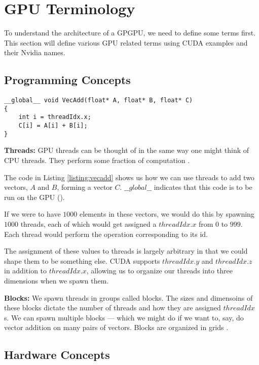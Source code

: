 \chapter{GPU Terminology}

To understand the architecture of a GPGPU, we need to define some terms first.
This section will define various GPU related terms using CUDA examples and their
Nvidia names. 

\section{Programming Concepts}

\begin{lstlisting}[caption=A simple CUDA example., label={listing:vecadd}]
__global__ void VecAdd(float* A, float* B, float* C)
{
    int i = threadIdx.x;
    C[i] = A[i] + B[i];
}

\end{lstlisting}


\textbf{Threads:} GPU threads can be thought of in the same way one might
think of CPU threads. They perform some fraction of computation \cite{nvidiaCUDAProgramming}.

The code in Listing \ref{listing:vecadd} shows us how we can use threads to add two vectors,
$A$ and $B$, forming a vector $C$. $\_\_global\_\_$ indicates that this code
is to be run on the GPU (\cite{nvidiaCUDAProgramming}).

If we were to have $1000$ elements in these vectors, we would do this 
by spawning $1000$ threads, each of which would get assigned a $threadIdx.x$
from $0$ to $999$. Each thread would perform the operation corresponding to
its id.

The assignment of these values to threads is largely arbitrary in that
we could shape them to be something else. CUDA supports $threadIdx.y$ and
$threadIdx.z$ in addition to $threadIdx.x$, allowing us to organize
our threads into three dimensions when we spawn them.

\textbf{Blocks:} We spawn threads in groups called blocks. The sizes
and dimensoins of these blocks dictate the number of threads and how they
are assigned $threadIdx$s. We can spawn multiple blocks --- which we might
do if we want to, say, do vector addition on many pairs of vectors.
Blocks are organized in grids \cite{nvidiaCUDAProgramming}.

\section{Hardware Concepts}

